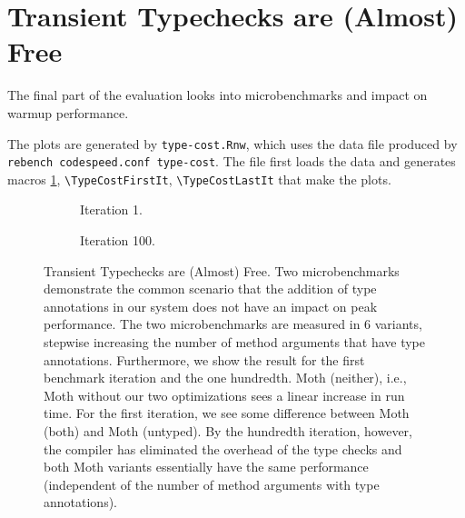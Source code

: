 \documentclass[a4paper,USenglish]{darts-v2019}
\newcommand{\ie}{i.e.\xspace}
\newcommand{\code}[1]{\texttt{#1}}
\begin{document}
\section{Transient Typechecks are (Almost) Free}

The final part of the evaluation looks into microbenchmarks
and impact on warmup performance.

The plots are generated by \code{type-cost.Rnw}, which
uses the data file produced by \code{rebench codespeed.conf type-cost}.
The file first loads the data and generates 
macros \cref{fig:type-cost-micro},
\code{\textbackslash{}TypeCostFirstIt},
\code{\textbackslash{}TypeCostLastIt} that make the plots.

\begin{figure}
  \begin{subfigure}[t]{0.5\textwidth}
    \centering
    \TypeCostFirstIt{}
    \caption{Iteration 1.}
  \end{subfigure}\hfill
  \begin{subfigure}[t]{0.5\textwidth}
    \centering
    \TypeCostLastIt{}
    \caption{Iteration 100.}
  \end{subfigure}

  \caption{Transient Typechecks are (Almost) Free.
    Two microbenchmarks demonstrate the common scenario that the addition
    of type annotations in our system does not have an impact on peak performance.
    The two microbenchmarks are measured in 6 variants, stepwise increasing the number
    of method arguments that have type annotations.
    Furthermore, we show the result for the first benchmark iteration and the
    one hundredth.
    Moth (neither), \ie, Moth without our two optimizations sees a linear increase in run time.
    For the first iteration, we see some difference between Moth (both) and Moth (untyped).
    By the hundredth iteration, however, the compiler has eliminated
    the overhead of the type checks
    and both Moth variants essentially have the same performance
    (independent of the number of method arguments with type annotations).}
	\label{fig:type-cost-micro}
\end{figure}
\end{document}
